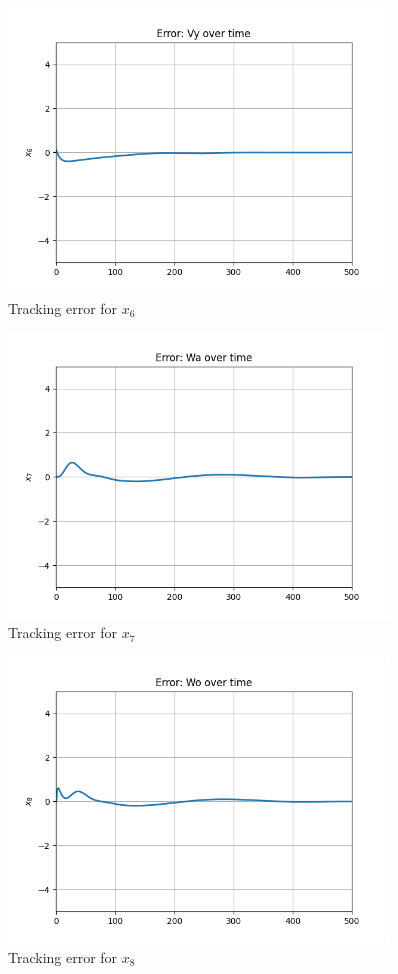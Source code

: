 \begin{figure}[H]
\centering
\includegraphics[width=0.9\textwidth]{pictures/mpc16.png}
\caption{Tracking error for $x_6$}
\label{fig:mpc16}
\end{figure}

\begin{figure}[H]
\centering
\includegraphics[width=0.9\textwidth]{pictures/mpc17.png}
\caption{Tracking error for $x_7$}
\label{fig:mpc17}
\end{figure}

\begin{figure}[H]
\centering
\includegraphics[width=0.9\textwidth]{pictures/mpc18.png}
\caption{Tracking error for $x_8$}
\label{fig:mpc18}
\end{figure}

